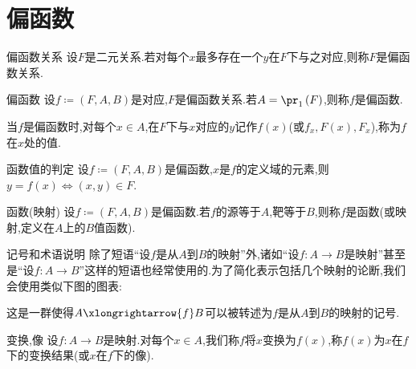 \section{偏函数}

\begin{definition}{偏函数关系}{}
	设$F$是二元关系.若对每个$x$最多存在一个$y$在$F$下与之对应,则称$F$是偏函数关系.
\end{definition}

\begin{definition}{偏函数}{}
	设$f\coloneq\left(F,A,B\right)$是对应,$F$是偏函数关系.若$A=\pr_{1}\left(F\right)$,则称$f$是偏函数.
	
	当$f$是偏函数时,对每个$x\in A$,在$F$下与$x$对应的$y$记作$f\left(x\right)$(或$f_{x},F\left(x\right),F_{x}$),称为$f$在$x$处的值.
\end{definition}

\begin{proposition}{函数值的判定}{}
	设$f\coloneq\left(F,A,B\right)$是偏函数,$x$是$f$的定义域的元素,则$y=f\left(x\right)\iff\left(x,y\right)\in F$.
\end{proposition}

\begin{definition}{函数(映射)}{}
	设$f\coloneq\left(F,A,B\right)$是偏函数.若$f$的源等于$A$,靶等于$B$,则称$f$是函数(或映射,定义在$A$上的$B$值函数).
\end{definition}

\begin{remark}{记号和术语说明}{}
	除了短语``设$f$是从$A$到$B$的映射''外,诸如``设$f:A\to B$是映射''甚至是``设$f:A\to B$''这样的短语也经常使用的.为了简化表示包括几个映射的论断,我们会使用类似下图的图表:
	\begin{center}
	\end{center}
	这是一群使得$A\xlongrightarrow{f}B$可以被转述为$f$是从$A$到$B$的映射的记号.
\end{remark}

\begin{definition}{变换,像}{}
	设$f:A\to B$是映射.对每个$x\in A$,我们称$f$将$x$变换为$f\left(x\right)$,称$f\left(x\right)$为$x$在$f$下的变换结果(或$x$在$f$下的像).
\end{definition}

